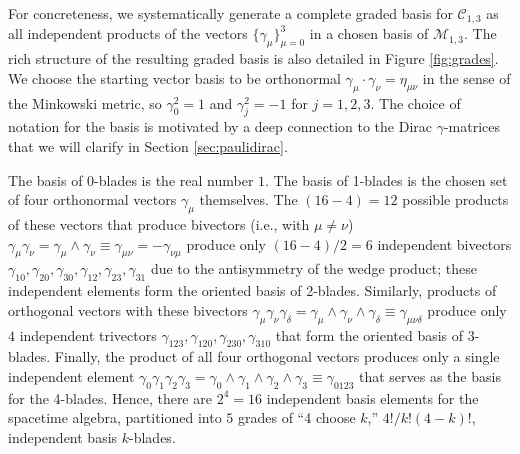 \documentclass[1p,sort&compress]{elsarticle}
\numberwithin{equation}{section}
\begin{document}
For concreteness, we systematically generate a complete graded basis for $\mathcal{C}_{1,3}$ as all independent products of the vectors $\{\gamma_\mu\}_{\mu=0}^3$ in a chosen basis of $\mathcal{M}_{1,3}$.  The rich structure of the resulting graded basis is also detailed in Figure \ref{fig:grades}.  We choose the starting vector basis to be orthonormal $\gamma_\mu\cdot\gamma_\nu = \eta_{\mu\nu}$ in the sense of the Minkowski metric, so $\gamma_0^2 = 1$ and $\gamma_j^2 = -1$ for $j=1,2,3$.  The choice of notation for the basis is motivated by a deep connection to the Dirac $\gamma$-matrices that we will clarify in Section \ref{sec:paulidirac}.

The basis of 0-blades is the real number $1$.  The basis of 1-blades is the chosen set of four orthonormal vectors $\gamma_\mu$ themselves.  The $(16-4)=12$ possible products of these vectors that produce bivectors (i.e., with $\mu\neq\nu$) $\gamma_\mu\gamma_\nu = \gamma_\mu \wedge \gamma_\nu \equiv \gamma_{\mu\nu} = -\gamma_{\nu\mu}$ produce only $(16-4)/2=6$ independent bivectors $\gamma_{10},\gamma_{20},\gamma_{30},\gamma_{12},\gamma_{23},\gamma_{31}$ due to the antisymmetry of the wedge product; these independent elements form the oriented basis of 2-blades.  Similarly, products of orthogonal vectors with these bivectors $\gamma_\mu\gamma_\nu\gamma_\delta = \gamma_\mu \wedge \gamma_\nu \wedge \gamma_\delta \equiv \gamma_{\mu\nu\delta}$ produce only $4$ independent trivectors $\gamma_{123},\gamma_{120},\gamma_{230},\gamma_{310}$ that form the oriented basis of 3-blades.  Finally, the product of all four orthogonal vectors produces only a single independent element $\gamma_0\gamma_1\gamma_2\gamma_3 = \gamma_0\wedge\gamma_1\wedge\gamma_2\wedge\gamma_3 \equiv \gamma_{0123}$ that serves as the basis for the 4-blades. Hence, there are $2^4 = 16$ independent basis elements for the spacetime algebra, partitioned into $5$ grades of ``4 choose $k$,'' $4!/k!(4-k)!$, independent basis $k$-blades.  
\end{document}

